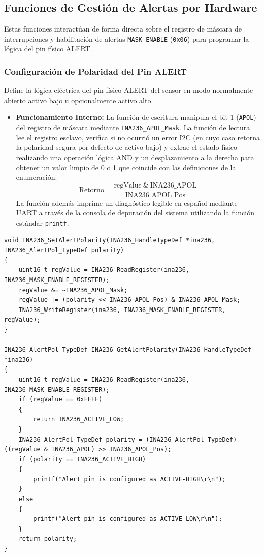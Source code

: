 \documentclass[
10pt, %
a4paper, %
oneside, %
headinclude,footinclude, %
BCOR5mm, %
]{scrartcl}
\begin{document}
\subsection{Funciones de Gestión de Alertas por Hardware}
Estas funciones interactúan de forma directa sobre el registro de máscara de interrupciones y habilitación de alertas \texttt{MASK\_ENABLE} (\texttt{0x06}) para programar la lógica del pin físico ALERT.

\subsubsection{Configuración de Polaridad del Pin ALERT}
Define la lógica eléctrica del pin físico ALERT del sensor en modo normalmente abierto activo bajo u opcionalmente activo alto.

\begin{itemize}
	\item \textbf{Funcionamiento Interno:}
		La función de escritura manipula el bit 1 (\texttt{APOL}) del registro de máscara mediante \texttt{INA236\_APOL\_Mask}.
		La función de lectura lee el registro esclavo, verifica si no ocurrió un error I2C (en cuyo caso retorna la polaridad segura por defecto de activo bajo) y extrae el estado físico realizando una operación lógica AND y un desplazamiento a la derecha para obtener un valor limpio de 0 o 1 que coincide con las definiciones de la enumeración:
		\begin{equation}
			\text{Retorno} = \frac{\text{regValue} \ \& \ \text{INA236\_APOL}}{\text{INA236\_APOL\_Pos}}
		\end{equation}
		La función además imprime un diagnóstico legible en español mediante UART a través de la consola de depuración del sistema utilizando la función estándar \texttt{printf}.
\end{itemize}

\begin{lstlisting}[style=CMakeStyle]
void INA236_SetAlertPolarity(INA236_HandleTypeDef *ina236, INA236_AlertPol_TypeDef polarity)
{
    uint16_t regValue = INA236_ReadRegister(ina236, INA236_MASK_ENABLE_REGISTER);
    regValue &= ~INA236_APOL_Mask;
    regValue |= (polarity << INA236_APOL_Pos) & INA236_APOL_Mask;
    INA236_WriteRegister(ina236, INA236_MASK_ENABLE_REGISTER, regValue);
}

INA236_AlertPol_TypeDef INA236_GetAlertPolarity(INA236_HandleTypeDef *ina236)
{
    uint16_t regValue = INA236_ReadRegister(ina236, INA236_MASK_ENABLE_REGISTER);
    if (regValue == 0xFFFF)
    {
        return INA236_ACTIVE_LOW;
    }
    INA236_AlertPol_TypeDef polarity = (INA236_AlertPol_TypeDef)((regValue & INA236_APOL) >> INA236_APOL_Pos);
    if (polarity == INA236_ACTIVE_HIGH)
    {
        printf("Alert pin is configured as ACTIVE-HIGH\r\n");
    }
    else
    {
        printf("Alert pin is configured as ACTIVE-LOW\r\n");
    }
    return polarity;
}
\end{lstlisting}
\end{document}
